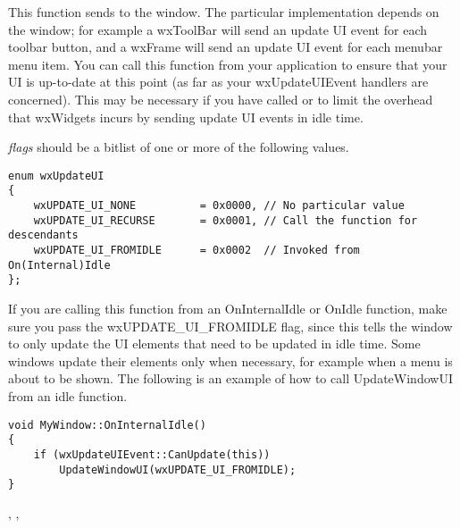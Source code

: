 \label{wxwindowupdatewindowui}


This function sends  to
the window. The particular implementation depends on the window; for
example a wxToolBar will send an update UI event for each toolbar button,
and a wxFrame will send an update UI event for each menubar menu item.
You can call this function from your application to ensure that your
UI is up-to-date at this point (as far as your wxUpdateUIEvent handlers
are concerned). This may be necessary if you have called
 or
 to
limit the overhead that wxWidgets incurs by sending update UI events in idle time.

{\it flags} should be a bitlist of one or more of the following values.

\begin{verbatim}
enum wxUpdateUI
{
    wxUPDATE_UI_NONE          = 0x0000, // No particular value
    wxUPDATE_UI_RECURSE       = 0x0001, // Call the function for descendants
    wxUPDATE_UI_FROMIDLE      = 0x0002  // Invoked from On(Internal)Idle
};
\end{verbatim}

If you are calling this function from an OnInternalIdle or OnIdle
function, make sure you pass the wxUPDATE\_UI\_FROMIDLE flag, since
this tells the window to only update the UI elements that need
to be updated in idle time. Some windows update their elements
only when necessary, for example when a menu is about to be shown.
The following is an example of how to call UpdateWindowUI from
an idle function.

\begin{verbatim}
void MyWindow::OnInternalIdle()
{
    if (wxUpdateUIEvent::CanUpdate(this))
        UpdateWindowUI(wxUPDATE_UI_FROMIDLE);
}
\end{verbatim}


,
,


\label{wxwindowvalidate}


